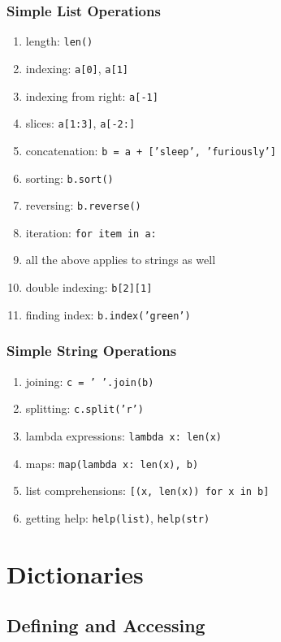 \documentclass[presentation]{beamer}
\begin{document}
\begin{frame}
  \frametitle{Simple List Operations}
  \scriptsize

\begin{enumerate}
\item length: \texttt{len()}
\item indexing: \texttt{a[0]}, \texttt{a[1]}
\item indexing from right: \texttt{a[-1]}
\item slices: \texttt{a[1:3]}, \texttt{a[-2:]}
\item concatenation: \texttt{b = a + ['sleep', 'furiously']}
\item sorting: \texttt{b.sort()}
\item reversing: \texttt{b.reverse()}
\item iteration: \texttt{for item in a:}
\item all the above applies to strings as well
\item double indexing: \texttt{b[2][1]}
\item finding index: \texttt{b.index('green')}
\end{enumerate}
\end{frame}

\begin{frame}
  \frametitle{Simple String Operations}
  \scriptsize

\begin{enumerate}
\item joining: \texttt{c = ' '.join(b)}
\item splitting: \texttt{c.split('r')}
\item lambda expressions: \texttt{lambda x: len(x)}
\item maps: \texttt{map(lambda x: len(x), b)}
\item list comprehensions: \texttt{[(x, len(x)) for x in b]}
\item getting help: \texttt{help(list)}, \texttt{help(str)}
\end{enumerate}
\end{frame}

\section{Dictionaries}

\subsection{Defining and Accessing}
\end{document}
